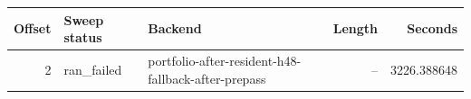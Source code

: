{\small
\begin{tabular}{rllrr}
\hline
Offset & Sweep status & Backend & Length & Seconds \\
\hline
2 & ran_failed & portfolio-after-resident-h48-fallback-after-prepass & -- & 3226.388648 \\
\hline
\end{tabular}
}
